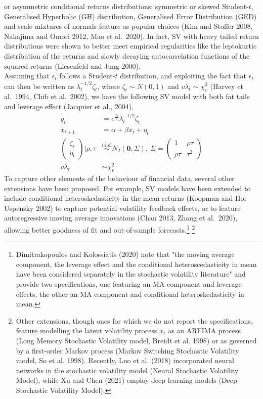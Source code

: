 \documentclass[
]{book}
\theoremstyle{break}
\theoremstyle{nonumberplain}
\begin{document}
or asymmetric conditional returns distributions: symmetric or skewed
Student-\(t\), Generalised Hyperbolic (GH) distribution, Generalised
Error Distribution (GED) and scale mixtures of normals feature as
popular choices (Kim and Stoffer 2008, Nakajima and Omori 2012, Mao et
al.~2020). In fact, SV with heavy tailed return distributions were shown
to better meet empirical regularities like the leptokurtic distribution
of the returns and slowly decaying autocorrelation functions of the
squared returns (Liesenfeld and Jung 2000).\\
Assuming that \(\epsilon_t\) follows a Student-\(t\) distribution, and
exploiting the fact that \(\epsilon_t\) can then be written as
\(\lambda_t^{-1/2}\zeta_t\), where \(\zeta_t \sim N(0,1)\) and
\(v\lambda_t \sim \chi^2_v\) (Harvey et al.~1994, Chib et al.~2002), we
have the following SV model with both fat tails and leverage effect
(Jacquier et al., 2004), \begin{align*}
    y_t & = e^{\frac{x_t}{2}}\lambda_t^{-1/2}\zeta_t\\
    x_{t+1} & = \alpha + \beta x_t + \eta_t\\
    \begin{pmatrix}
       \zeta_t \\
       \eta_t
    \end{pmatrix} \Big|\rho,\tau & \overset{i.i.d.}{\sim}  N_2(\mathbf{0},\Sigma), \ \Sigma=
    \begin{pmatrix}
       1 & \rho\tau \\
       \rho\tau & \tau^2
    \end{pmatrix}\\
    v\lambda_t & \sim \chi^2_v
\end{align*} To capture other elements of the behaviour of financial
data, several other extensions have been proposed. For example, SV
models have been extended to include conditional heteroskedasticity in
the mean returns (Koopman and Hol Uspensky 2002) to capture potential
volatility feedback effects, or to feature autoregressive moving average
innovations (Chan 2013, Zhang et al.~2020), allowing better goodness of
fit and out-of-sample
forecasts.\footnote{Dimitrakopoulos and Kolossiatis (2020) note that "the moving average component, the leverage effect and the conditional heteroscedasticity in mean have been considered separately in the stochastic volatility literature" and provide two specifications, one featuring an MA component and leverage effects, the other an MA component and conditional heteroskedasticity in mean.}
\footnote{Other extensions, though ones for which we do not report the specifications, feature modelling the latent volatility process $x_t$ as an ARFIMA process (Long Memory Stochastic Volatility model, Breidt et al. 1998) or as governed by a first-order Markov process (Markov Switching Stochastic Volatility model, So et al. 1998). Recently, Luo et al. (2018) incorporated neural networks in the stochastic volatility model (Neural Stochastic Volatility Model), while Xu and Chen (2021) employ deep learning models (Deep Stochastic Volatility Model).}
\end{document}

